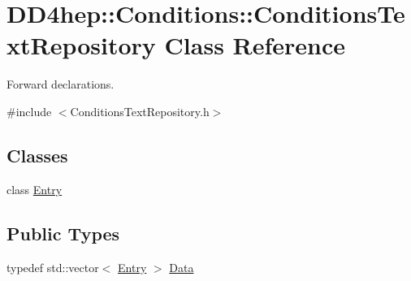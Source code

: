 \hypertarget{class_d_d4hep_1_1_conditions_1_1_conditions_text_repository}{}\section{D\+D4hep\+:\+:Conditions\+:\+:Conditions\+Text\+Repository Class Reference}
\label{class_d_d4hep_1_1_conditions_1_1_conditions_text_repository}


Forward declarations.  




{\ttfamily \#include $<$Conditions\+Text\+Repository.\+h$>$}

\subsection*{Classes}
\begin{DoxyCompactItemize}
\item 
class \hyperlink{class_d_d4hep_1_1_conditions_1_1_conditions_text_repository_1_1_entry}{Entry}
\end{DoxyCompactItemize}
\subsection*{Public Types}
\begin{DoxyCompactItemize}
\item 
typedef std\+::vector$<$ \hyperlink{class_d_d4hep_1_1_conditions_1_1_conditions_text_repository_1_1_entry}{Entry} $>$ \hyperlink{class_d_d4hep_1_1_conditions_1_1_conditions_text_repository_afe5d8989bf0bcd711e59f838943b5115}{Data}
\end{DoxyCompactItemize}
